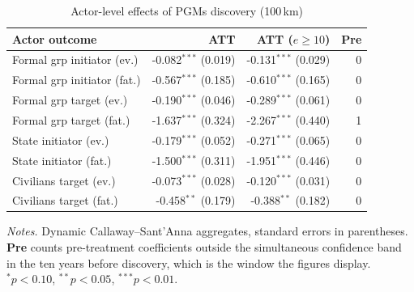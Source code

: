 \begin{table}[H]
\centering
\footnotesize
\caption{Actor-level effects of PGMs discovery (100\,km)}
\label{tab:mech_pgms}
\begin{tabular}{lrrr}
\toprule
\textbf{Actor outcome} & \textbf{ATT} & \textbf{ATT ($e\geq10$)} & \textbf{Pre} \\
\midrule
Formal grp initiator (ev.) & -0.082$^{***}$ (0.019) & -0.131$^{***}$ (0.029) & 0 \\
Formal grp initiator (fat.) & -0.567$^{***}$ (0.185) & -0.610$^{***}$ (0.165) & 0 \\
Formal grp target (ev.) & -0.190$^{***}$ (0.046) & -0.289$^{***}$ (0.061) & 0 \\
Formal grp target (fat.) & -1.637$^{***}$ (0.324) & -2.267$^{***}$ (0.440) & 1 \\
State initiator (ev.) & -0.179$^{***}$ (0.052) & -0.271$^{***}$ (0.065) & 0 \\
State initiator (fat.) & -1.500$^{***}$ (0.311) & -1.951$^{***}$ (0.446) & 0 \\
Civilians target (ev.) & -0.073$^{***}$ (0.028) & -0.120$^{***}$ (0.031) & 0 \\
Civilians target (fat.) & -0.458$^{**}$ (0.179) & -0.388$^{**}$ (0.182) & 0 \\
\bottomrule
\end{tabular}
\begin{minipage}{0.9\textwidth}\vspace{4pt}\scriptsize \textit{Notes.} Dynamic Callaway--Sant'Anna aggregates, standard errors in parentheses. \textbf{Pre} counts pre-treatment coefficients outside the simultaneous confidence band in the ten years before discovery, which is the window the figures display. $^{*}p<0.10$, $^{**}p<0.05$, $^{***}p<0.01$.\end{minipage}
\end{table}
